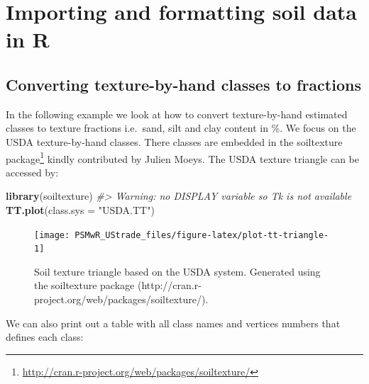 \documentclass[graybox,natbib,nospthms,UStrade]{svmono}
\newenvironment{Shaded}{\begin{snugshade}}{\end{snugshade}}
\newcommand{\CommentTok}[1]{\textcolor[rgb]{0.37,0.37,0.37}{\textit{#1}}}
\newcommand{\DataTypeTok}[1]{\textcolor[rgb]{0.27,0.27,0.27}{#1}}
\newcommand{\KeywordTok}[1]{\textcolor[rgb]{0.27,0.27,0.27}{\textbf{#1}}}
\newcommand{\NormalTok}[1]{#1}
\newcommand{\StringTok}[1]{\textcolor[rgb]{0.5,0.5,0.5}{#1}}
\renewcommand{\href}[2]{#2 (\url{#1})}
\renewcommand{\href}[2]{#2\footnote{\url{#1}}}
\begin{document}
\hypertarget{importing-and-formatting-soil-data-in-r}{%
\section{Importing and formatting soil data in R}\label{importing-and-formatting-soil-data-in-r}}

\hypertarget{converting-texture-by-hand-classes-to-fractions}{%
\subsection{Converting texture-by-hand classes to fractions}\label{converting-texture-by-hand-classes-to-fractions}}

In the following example we look at how to convert texture-by-hand estimated classes to texture fractions i.e.~sand, silt and clay content in \%. We focus on the USDA texture-by-hand classes. There classes are embedded in the \href{http://cran.r-project.org/web/packages/soiltexture/}{soiltexture package} kindly contributed by Julien Moeys. The USDA texture triangle can be accessed by:

\begin{Shaded}
\begin{Highlighting}[]
\KeywordTok{library}\NormalTok{(soiltexture)}
\CommentTok{#> Warning: no DISPLAY variable so Tk is not available}
\KeywordTok{TT.plot}\NormalTok{(}\DataTypeTok{class.sys =} \StringTok{"USDA.TT"}\NormalTok{)}
\end{Highlighting}
\end{Shaded}

\begin{figure}[H]

{\centering \texttt{[image: PSMwR\_UStrade\_files/figure-latex/plot-tt-triangle-1]} 

}

\caption{Soil texture triangle based on the USDA system. Generated using the soiltexture package (http://cran.r-project.org/web/packages/soiltexture/).}\label{fig:plot-tt-triangle}
\end{figure}

We can also print out a table with all class names and vertices numbers that defines each class:
\end{document}
